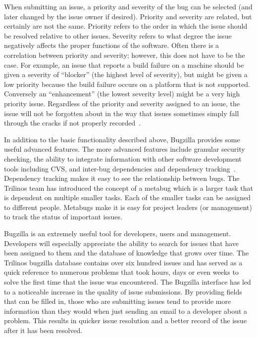 \documentclass[12pt,relax]{article}
\begin{document}
When submitting an issue, a 
priority and severity of the bug can be selected (and later changed by the 
issue owner if desired).  Priority and severity are related, but certainly are 
not the same.  Priority refers to the order in which the issue should be 
resolved relative to other issues.  Severity refers to what degree the issue 
negatively affects the proper functions of the software.  Often there is a 
correlation between priority and severity; however, this does not have to be
the case.  For example, an issue that reports a build failure on a 
machine should be given a severity of ``blocker'' (the highest level of 
severity), but might be given a low priority because the build failure occurs
on a platform that is not supported.  Conversely an ``enhancement'' (the 
lowest severity level) might be a very high priority issue.  Regardless of the 
priority and severity assigned to an issue, the issue will not be forgotten 
about in the way that issues sometimes simply fall through the cracks if not 
properly recorded~\cite{Bugzilla}.

In addition to the basic functionality described above, Bugzilla provides some 
useful advanced features.  The more advanced features include
granular security checking, the ability to integrate information with 
other software development tools including CVS, and inter-bug 
dependencies and dependency tracking~\cite{Bugzilla}.  Dependency tracking 
makes it easy to see the relationship 
between bugs.  The Trilinos team has introduced the concept of a metabug which 
is a larger task that is dependent on multiple smaller tasks.  Each of the 
smaller tasks can be assigned to different people. Metabugs make it is easy 
for project leaders (or management) to track the status of important issues. 

Bugzilla is an extremely useful tool for developers, users and management.  
Developers will especially appreciate the ability to search for issues 
that have been assigned to them and the database of knowledge that grows over
time.  The Trilinos bugzilla database contains over six hundred issues and 
has served as a quick reference to numerous problems that took hours, days 
or even weeks to solve the first time that the issue was encountered.  The 
Bugzilla interface has led to a noticeable increase in the quality of 
issue submissions.  By providing fields that can be filled in, those who are 
submitting issues tend to provide more information than they would when just 
sending an email to a developer about a problem.  This results in quicker 
issue resolution and a better record of the issue after it has been resolved.  
\end{document}
